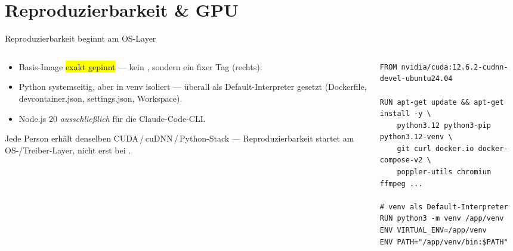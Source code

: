 \documentclass[aspectratio=169,11pt]{beamer}
\begin{document}
\section{Reproduzierbarkeit \& GPU}
\begin{frame}[fragile]{Reproduzierbarkeit beginnt am OS-Layer}
  \begin{columns}[T]
    \begin{column}{0.5\textwidth}
      \begin{itemize}
        \item Basis-Image \hl{exakt gepinnt} --- kein ,
              sondern ein fixer Tag (rechts):
        \item Python systemseitig, aber in venv  isoliert ---
              überall als Default-Interpreter gesetzt (Dockerfile,
              devcontainer.json, settings.json, Workspace).
        \item Node.js 20 \emph{ausschließlich} für die Claude-Code-CLI.
      \end{itemize}
      \begin{takeaway}[Konsequenz]
        Jede Person erhält denselben CUDA\,/\,cuDNN\,/\,Python-Stack ---
        Reproduzierbarkeit startet am OS-/Treiber-Layer, nicht erst bei
        .
      \end{takeaway}
    \end{column}
    \begin{column}{0.5\textwidth}
\begin{lstlisting}[language=mydocker]
FROM nvidia/cuda:12.6.2-cudnn-devel-ubuntu24.04

RUN apt-get update && apt-get install -y \
    python3.12 python3-pip python3.12-venv \
    git curl docker.io docker-compose-v2 \
    poppler-utils chromium ffmpeg ...

# venv als Default-Interpreter
RUN python3 -m venv /app/venv
ENV VIRTUAL_ENV=/app/venv
ENV PATH="/app/venv/bin:$PATH"
\end{lstlisting}
    \end{column}
  \end{columns}
\end{frame}
\end{document}
